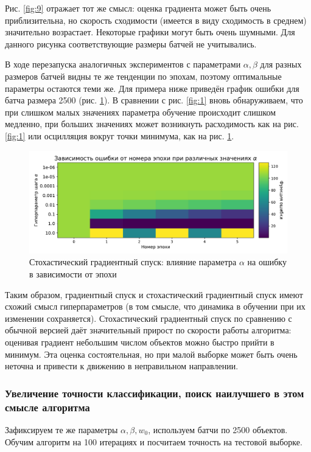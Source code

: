 \documentclass{article}
\begin{document}
                Рис. \ref{fig:9} отражает тот же смысл: оценка градиента может быть очень приблизительна, но скорость сходимости (имеется в виду сходимость в среднем) значительно возрастает. Некоторые графики могут быть очень шумными. Для данного рисунка соответствующие размеры батчей не учитывались.
                
                В ходе перезапуска аналогичных экспериментов с параметрами $\alpha, \beta$ для разных размеров батчей видны те же тенденции по эпохам, поэтому оптимальные параметры остаются теми же. Для примера ниже приведён график ошибки для батча размера 2500 (рис. \ref{fig:10}). В сравнении с рис. \ref{fig:1} вновь обнаруживаем, что при слишком малых значениях параметра обучение происходит слишком медленно, при больших значениях может возникнуть расходимость как на рис. \ref{fig:1} или осцилляция вокруг точки минимума, как на рис. \ref{fig:10}.
                \begin{figure}[H]
                    \centering
                    \includegraphics[width=0.8\linewidth]{./pictures/GDbatch2500_func.pdf}
                    \caption{Стохастический градиентный спуск: влияние параметра $\alpha$ на ошибку в зависимости от эпохи}
                    \label{fig:10}
                \end{figure}

                Таким образом, градиентный спуск и стохастический градиентный спуск имеют схожий смысл гиперпараметров (в том смысле, что динамика в обучении при их изменении сохраняется). Стохастический градиентный спуск по сравнению с обычной версией даёт значительный прирост по скорости работы алгоритма: оценивая градиент небольшим числом объектов можно быстро прийти в минимум. Эта оценка состоятельная, но при малой выборке может быть очень неточна и привести к движению в неправильном направлении.

            \subsubsection{Увеличение точности классификации, поиск наилучшего в этом смысле алгоритма}
                Зафиксируем те же параметры $\alpha, \beta, w_0$, используем батчи по 2500 объектов. Обучим алгоритм на 100 итерациях и посчитаем точность на тестовой выборке.
\end{document}
